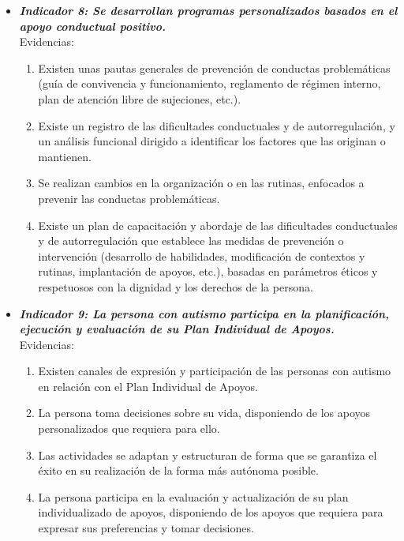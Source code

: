 \begin{itemize}
\begin{itemize}
\begin{itemize}
\begin{itemize}
\begin{enumerate}
				\end{enumerate}
				\item \textbf{\textit{Indicador 8: Se desarrollan programas personalizados basados en el apoyo conductual positivo.}}\\Evidencias:
				\begin{enumerate}
					\item Existen unas pautas generales de prevención de conductas problemáticas (guía de convivencia y funcionamiento, reglamento de régimen interno, plan de atención libre de sujeciones, etc.). 
					\item Existe un registro de las dificultades conductuales y de autorregulación, y un análisis funcional dirigido a identificar los factores que las originan o mantienen.   
					\item Se realizan cambios en la organización o en las rutinas, enfocados a prevenir las conductas problemáticas. 
					\item Existe un plan de capacitación y abordaje de las dificultades conductuales y de autorregulación que establece las medidas de prevención o intervención (desarrollo de habilidades, modificación de contextos y rutinas, implantación de apoyos, etc.), basadas en parámetros éticos y respetuosos con la dignidad y los derechos de la persona. 
					 
				\end{enumerate}
				\item \textbf{\textit{Indicador 9: La persona con autismo participa en la planificación, ejecución y evaluación de su Plan Individual de Apoyos.}}\\Evidencias:
				\begin{enumerate}
					\item Existen canales de expresión y participación de las personas con autismo en relación con el Plan Individual de Apoyos. 
					\item La persona toma decisiones sobre su vida, disponiendo de los apoyos personalizados que requiera para ello.  
					\item Las actividades se adaptan y estructuran de forma que se garantiza el éxito en su realización de la forma más autónoma posible. 
					\item La persona participa en la evaluación y actualización de su plan individualizado de apoyos, disponiendo de los apoyos que requiera para expresar sus preferencias y tomar decisiones.  
					 

\end{enumerate}
\end{itemize}
\end{itemize}
\end{itemize}
\end{itemize}
